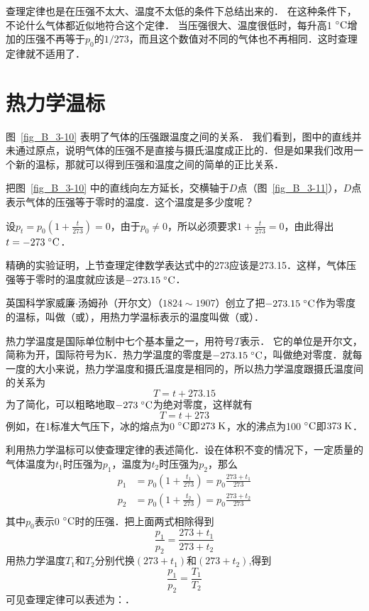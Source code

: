 查理定律也是在压强不太大、温度不太低的条件下总结出来的．
在这种条件下，不论什么气体都近似地符合这个定律．
当压强很大、温度很低时，每升高1$\;{}^\circ\text{C}$增加的压强不再等于$p_0$的$1/273$，而且这个数值对不同的气体也不再相同．这时查理定律就不适用了．


\section{热力学温标}\label{sec-B-3-4-thermodynamic-temperature-scale}
图~\ref{fig_B_3-10} 表明了气体的压强跟温度之间的关系．
我们看到，图中的直线并未通过原点，说明气体的压强不是直接与摄氏温度成正比的．但是如果我们改用一个新的温标，那就可以得到压强和温度之间的简单的正比关系．



把图~\ref{fig_B_3-10} 中的直线向左方延长，交横轴于$D$点（图~\ref{fig_B_3-11}），$D$点表示气体的压强等于零时的温度．这个温度是多少度呢？

设$p_t=p_0 \left(1+\frac{t}{273}\right)=0$，由于$p_0\ne 0$，所以必须要求$1+\frac{t}{273}=0$，由此得出$t=-273 \;{}^\circ\text{C} $．

精确的实验证明，上节查理定律数学表达式中的273应该是273.15．这样，气体压强等于零时的温度就应该是$-273.15 \;{}^\circ\text{C} $．



英国科学家威廉$\cdot$汤姆孙（开尔文）（$1824 \sim 1907$）创立了把$-273.15 \;{}^\circ\text{C}$作为零度的温标，叫做（或），用热力学温标表示的温度叫做（或）．

热力学温度是国际单位制中七个基本量之一，用符号$T$表示．
它的单位是开尔文，简称为开，国际符号为K．热力学温度的零度是$-273.15 \;{}^\circ\text{C}$，叫做绝对零度．就每一度的大小来说，热力学温度和摄氏温度是相同的，所以热力学温度跟摄氏温度间的关系为
\[T=t+273.15 \]
为了简化，可以粗略地取$-273 \;{}^\circ\text{C} $为绝对零度，这样就有
\[T=t+273 \]
例如，在1标准大气压下，冰的熔点为0$\;{}^\circ\text{C}$即$273 \;\text{K} $，水的沸点为100$\;{}^\circ\text{C}$即$373 \;\text{K}$．

利用热力学温标可以使查理定律的表述简化．设在体积不变的情况下，一定质量的气体温度为$t_1$时压强为$p_1$，温度为$t_2$时压强为$p_2$，那么
\[\begin{split}
p_1&=p_0\left(1+\frac{t_1}{273}\right)=p_0\frac{273+t_1}{273}\\
p_2&=p_0\left(1+\frac{t_2}{273}\right)=p_0\frac{273+t_2}{273}\\
\end{split} \]
其中$p_0$表示0$\;{}^\circ\text{C}$时的压强．把上面两式相除得到
\[\frac{p_1}{p_2}=\frac{273+t_1}{273+t_2} \]
用热力学温度$T_1$和$T_2$分别代换$(273+t_1)$和$(273+t_2)$,得到
\[\frac{p_1}{p_2}=\frac{T_1}{T_2} \]
可见查理定律可以表述为：．

